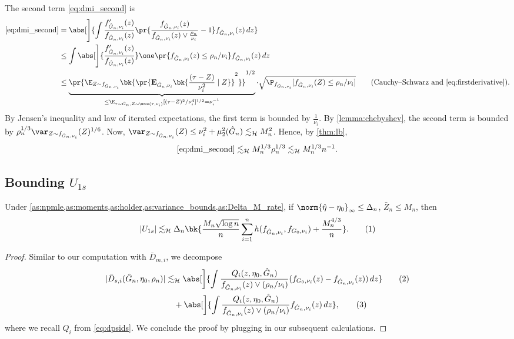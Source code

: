 \documentclass[12pt, reqno]{amsart}
\newcommand\numberthis{\addtocounter{equation}{1}\tag{\theequation}}
\newcommand{\leH}{\lesssim_{\mathcal{H}}}
\newcommand{\hateta}{\hat\eta}
\newcommand{\PE}{\mathbf{E}}
\newcommand{\Dinfty}{\norm{\hateta - \eta_0}_{\infty}} %
\numberwithin{equation}{section}
\begin{document}
\begin{refsection}
\begin{appendices}
The second term   \eqref{eq:dmi_second} is
\begin{align*}
\eqref{eq:dmi_second} &= \abs[\Bigg]{
    \int \frac{f'_{\hat G_n, \nu_i}
(z)}{
f_{\hat G_n, \nu_i}(z)} \pr{\frac{f_{\hat G_n, \nu_i}(z)}{f_{\hat G_n, \nu_i}(z) \vee
\frac{\rho_n}{\nu_i}} - 1} f_{\hat G_n, \nu_i}(z)\,dz
} \\
&\le \int \abs[\Bigg]{
    \frac{f'_{\hat G_n, \nu_i}
(z)}{
f_{\hat G_n, \nu_i}(z)}} \one\pr{f_{\hat G_n, \nu_i}(z) \le \rho_n/\nu_i} f_{\hat G_n,
\nu_i}(z)\,dz \\
&\le \underbrace{\pr{\E_{Z\sim f_{\hat G_n, \nu_i}} \bk{
    \pr{\PE_{\hat G_n, \nu_i}\bk{ \frac{(\tau - Z)}{\nu_i^2} \mid Z}}^2
}}^{1/2}}_{ \le \E_{\tau \sim \hat G_n, Z \sim \Norm(\tau, \nu_i)}[(\tau - Z)^2 / \nu_i^4]^{1/2} = \nu_i^{-1}}
\cdot \sqrt{\P_{f_{\hat G_n, \nu_i}} [f_{\hat G_n, \nu_i}(Z) \le \rho_n/\nu_i]}
\tag{Cauchy--Schwarz and \eqref{eq:firstderivative}}.
\end{align*}
By Jensen's inequality and law of iterated expectations, the first term is bounded by
$\frac{1}{\nu_i}$. By \cref{lemma:chebyshev}, the second term is bounded by $\rho_n^
{1/3}\var_{Z\sim f_{\hat G_n, \nu_i}}(Z)^{1/6}$. Now, $
\var_{Z\sim f_{\hat G_n, \nu_i}}(Z) \le \nu_i^2 + \mu_2^2(\hat G_n) \leH M_n^2
$.
Hence, by \cref{thm:lb}, \[
\eqref{eq:dmi_second}
\leH M_n^{1/3} \rho_n^{1/3} \leH M_n^{1/3}n^{-1}. 
\]






\subsection{Bounding $U_{1s}$}

\begin{lemma}
\label{lemma:Dsi_final}
Under \cref{as:npmle,as:moments,as:holder,as:variance_bounds,as:Delta_M_rate}, if $\Dinfty
\le \Delta_n$,
$\bar Z_n \le M_n$, then
\[
|U_{1s}| \leH \Delta_n \bk{\frac{M_n \sqrt{\log n} }{n} \sum_{i=1}^n h(f_{\hat G_n, \nu_i}, f_{G_0,
\nu_i}) +  \frac{M_n^{4/3}}{n}}.
\numberthis \label{eq:dsi_final}
\]
\end{lemma}

\begin{proof}
Similar to our computation with $\bar D_{m,i}$, we
decompose \begin{align*}
|\bar D_{s,i}(\hat G_n, \eta_0, \rho_n)| &\leH \abs[\bigg]{\int \frac{Q_i(z, \eta_0,
\hat G_n)}{f_{\hat G_n,
\nu_i}(z) \vee (\rho_n / \nu_i)}
(f_{G_0, \nu_i}(z) - f_{\hat G_n, \nu_i}(z) )\,dz} \numberthis
\label{eq:dsi_first}
\\ &\quad+ \abs[\bigg]{\int \frac{Q_i(z, \eta_0, \hat G_n)}{f_{\hat G_n,
\nu_i}( z) \vee (\rho_n /
\nu_i)} f_{\hat
G_n, \nu_i}(z)  \,dz},  \numberthis
\label{eq:dsi_third}
\end{align*}
where we recall $Q_i$ from 
\eqref{eq:dpsids}.
We conclude the proof by plugging in  our subsequent calculations.
\end{proof}


\end{appendices}
\end{refsection}
\end{document}
